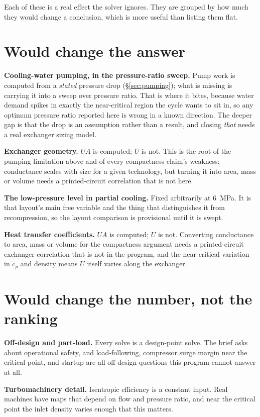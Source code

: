 \documentclass[11pt,a4paper]{report}
\begin{document}
Each of these is a real effect the solver ignores. They are grouped by how
much they would change a conclusion, which is more useful than listing them
flat.

\section{Would change the answer}

\textbf{Cooling-water pumping, in the pressure-ratio sweep.} Pump work is
computed from a \emph{stated} pressure drop (\S\ref{sec:pumping}); what is
missing is carrying it into a sweep over pressure ratio. That is where it
bites, because water demand spikes in exactly the near-critical region the
cycle wants to sit in, so any optimum pressure ratio reported here is wrong
in a known direction. The deeper gap is that the drop is an assumption
rather than a result, and closing \emph{that} needs a real exchanger sizing
model.

\textbf{Exchanger geometry.} $UA$ is computed; $U$ is not. This is the root
of the pumping limitation above and of every compactness claim's weakness:
conductance scales with size for a given technology, but turning it into
area, mass or volume needs a printed-circuit correlation that is not here.

\textbf{The low-pressure level in partial cooling.} Fixed arbitrarily at
\SI{6}{\mega\pascal}. It is that layout's main free variable and the thing
that distinguishes it from recompression, so the layout comparison is
provisional until it is swept.

\textbf{Heat transfer coefficients.} $UA$ is computed; $U$ is not.
Converting conductance to area, mass or volume for the compactness argument
needs a printed-circuit exchanger correlation that is not in the program,
and the near-critical variation in $c_p$ and density means $U$ itself varies
along the exchanger.

\section{Would change the number, not the ranking}

\textbf{Off-design and part-load.} Every solve is a design-point solve. The
brief asks about operational safety, and load-following, compressor surge
margin near the critical point, and startup are all off-design questions
this program cannot answer at all.

\textbf{Turbomachinery detail.} Isentropic efficiency is a constant input.
Real machines have maps that depend on flow and pressure ratio, and near the
critical point the inlet density varies enough that this matters.
\end{document}
